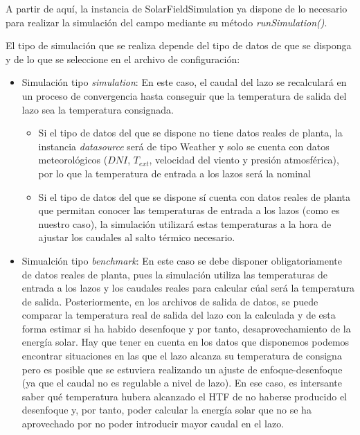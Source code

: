 A partir de aquí, la instancia de SolarFieldSimulation ya dispone de lo
necesario para realizar la simulación del campo mediante su método
\emph{runSimulation()}.

El tipo de simulación que se realiza depende del tipo de datos de que se
disponga y de lo que se seleccione en el archivo de configuración:

\begin{itemize}
\tightlist
\item
  Simulación tipo \emph{simulation}: En este caso, el caudal del lazo se
  recalculará en un proceso de convergencia hasta conseguir que la
  temperatura de salida del lazo sea la temperatura consignada.

  \begin{itemize}
  \tightlist
  \item
    Si el tipo de datos del que se dispone no tiene datos reales de
    planta, la instancia \emph{datasource} será de tipo Weather y solo
    se cuenta con datos meteorológicos (\(DNI\), \(T_{ext}\), velocidad
    del viento y presión atmosférica), por lo que la temperatura de
    entrada a los lazos será la nominal
  \item
    Si el tipo de datos del que se dispone sí cuenta con datos reales de
    planta que permitan conocer las temperaturas de entrada a los lazos
    (como es nuestro caso), la simulación utilizará estas temperaturas a
    la hora de ajustar los caudales al salto térmico necesario.
  \end{itemize}
\item
  Simualción tipo \emph{benchmark}: En este caso se debe disponer
  obligatoriamente de datos reales de planta, pues la simulación utiliza
  las temperaturas de entrada a los lazos y los caudales reales para
  calcular cúal será la temperatura de salida. Posteriormente, en los
  archivos de salida de datos, se puede comparar la temperatura real de
  salida del lazo con la calculada y de esta forma estimar si ha habido
  desenfoque y por tanto, desaprovechamiento de la energía solar. Hay
  que tener en cuenta en los datos que disponemos podemos encontrar
  situaciones en las que el lazo alcanza su temperatura de consigna pero
  es posible que se estuviera realizando un ajuste de enfoque-desenfoque
  (ya que el caudal no es regulable a nivel de lazo). En ese caso, es
  intersante saber qué temperatura hubera alcanzado el HTF de no haberse
  producido el desenfoque y, por tanto, poder calcular la energía solar
  que no se ha aprovechado por no poder introducir mayor caudal en el
  lazo.
\end{itemize}

